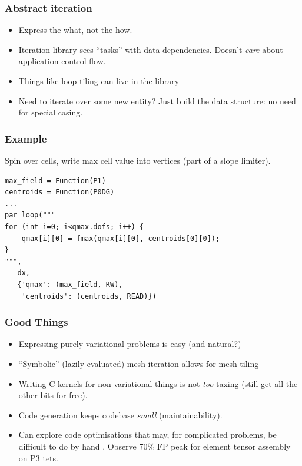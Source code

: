 \documentclass[presentation]{beamer}
\begin{document}
\begin{frame}
  \frametitle{Abstract iteration}
  \begin{itemize}[<+->]
  \item Express the what, not the how.
  \item Iteration library sees ``tasks'' with data dependencies.
    Doesn't \emph{care} about application control flow.
  \item Things like loop tiling can live in the library
  \item Need to iterate over some new entity?  Just build the data
    structure: no need for special casing.
  \end{itemize}
\end{frame}

\begin{frame}[fragile]
  \frametitle{Example}
  Spin over cells, write max cell value into vertices (part of a slope
  limiter).

\begin{verbatim}
max_field = Function(P1)
centroids = Function(P0DG)
...
par_loop("""
for (int i=0; i<qmax.dofs; i++) {
    qmax[i][0] = fmax(qmax[i][0], centroids[0][0]);
}
""",
   dx,
   {'qmax': (max_field, RW),
    'centroids': (centroids, READ)})
\end{verbatim}
\end{frame}
\begin{frame}[fragile]
  \frametitle{Good Things\footnotemark[1]}
  \begin{itemize}
  \item Expressing purely variational problems is easy (and natural?)
  \item ``Symbolic'' (lazily evaluated) mesh iteration allows for mesh
    tiling
  \item Writing C kernels for non-variational things is not \emph{too}
    taxing (still get all the other bits for free).
  \item Code generation keeps codebase \emph{small} (maintainability).
  \item Can explore code optimisations that may, for complicated
    problems, be difficult to do by
    hand \parencite{Olgaard:2010,Luporini:2015}.  Observe 70\% FP peak
    for element tensor assembly on P3 tets.
  \end{itemize}
\end{frame}
\end{document}
